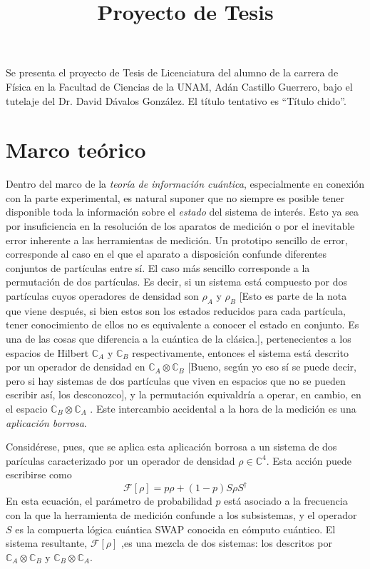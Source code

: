 \documentclass[onecolumn,11pt]{article}
\title{Proyecto de Tesis} \date{}
\newcommand{\mcF}{\mathcal{F}}
\newcommand{\Hh}{\mathbb{C}} %
\newcommand{\nota}[1]{{\color{red} [#1]}}
\newcommand{\notaAd}[1]{{\color{blue} [#1]}} %
\begin{document}
\maketitle
\thispagestyle{empty}
Se presenta el proyecto de Tesis de Licenciatura del alumno de la carrera de Física en la Facultad de Ciencias de la UNAM, Adán Castillo Guerrero, bajo el tutelaje del Dr. David Dávalos González. El título tentativo es ``Título chido''.

\section{Marco teórico}


Dentro del marco de la \textit{teoría de información cuántica}, especialmente en conexión con la parte experimental, es natural suponer que no siempre es posible tener disponible toda la información sobre el \textit{estado} del sistema de interés. Esto ya sea por insuficiencia en la resolución de los aparatos de medición o por el inevitable error inherente a las herramientas de medición. Un prototipo sencillo de error, corresponde al caso en el que el aparato a disposición confunde diferentes conjuntos de partículas entre sí. El caso más sencillo corresponde a la permutación de dos partículas. Es decir, si un sistema está compuesto por dos partículas cuyos operadores de densidad son $\rho_{A}$ y $\rho_{B}$ \nota{Esto es parte de la nota que viene después, si bien estos son los estados reducidos para cada partícula, tener conocimiento de ellos no es equivalente a conocer el estado en conjunto. Es una de las cosas que diferencia a la cuántica de la clásica.}, pertenecientes a los espacios de Hilbert $\Hh_{A}$ y $\Hh_{B}$ respectivamente, entonces el sistema está descrito por un operador de densidad en $\Hh_{A}\otimes\Hh_{B}$ \notaAd{Bueno, según yo eso sí se puede decir, pero si hay sistemas de dos partículas que viven en espacios que no se pueden escribir así, los desconozco}, y la permutación equivaldría a operar, en cambio, en el espacio $\Hh_{B}\otimes\Hh_{A}$ \cite{FuzzyMeasurements}. Este intercambio accidental a la hora de la medición es una \textit{aplicación borrosa}.

Considérese, pues, que se aplica esta aplicación borrosa a un sistema de dos parículas caracterizado por un operador de densidad $\rho\in\Hh^{4}$. Esta acción puede escribirse como
\begin{equation}\label{eq:Fuzzy2}
\mcF[\rho]=p\rho+(1-p)S\rho S^{\dag}
\end{equation}
En esta ecuación, el parámetro  de probabilidad $p$ está asociado a la frecuencia con la que la herramienta de medición confunde a los subsistemas, y el operador $S$ es la compuerta lógica cuántica SWAP conocida en cómputo cuántico. El sistema resultante, $\mcF[\rho]$ ,es una mezcla de dos sistemas: los descritos por $\Hh_{A}\otimes\Hh_{B}$ y $\Hh_{B}\otimes\Hh_{A}$.
\end{document}
